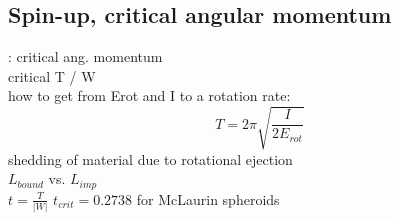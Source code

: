\subsection{Spin-up, critical angular momentum}
\cite{Canup:2000p3542}: critical ang. momentum\\
critical T / W \\
how to get from Erot and I to a rotation rate:
\begin{equation}
T = 2 \pi \sqrt{ \frac{I}{2 E_{rot}} }
\end{equation}
shedding of material due to rotational ejection \\
$L_{bound}$ vs. $L_{imp}$ \\
$t = \frac{T}{|W|}$
$t_{crit} = 0.2738$ for McLaurin spheroids \citep{1987gady.book.....B} \citep{chandrasekhar1969ellipsoidal}

